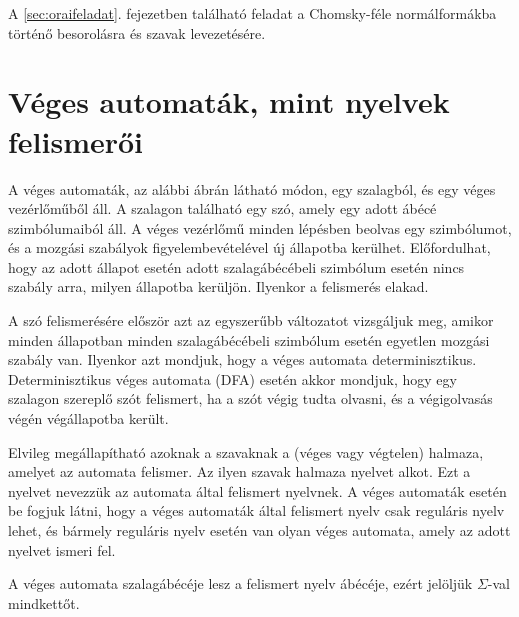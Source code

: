 \documentclass[a4paper]{article}
\begin{document}
A \ref{sec:oraifeladat}. fejezetben található feladat a Chomsky-féle
normálformákba történő besorolásra és szavak levezetésére.

\section{Véges automaták, mint nyelvek felismerői}

A véges automaták, az alábbi ábrán látható módon, egy szalagból,
és egy véges vezérlőműből áll. A szalagon található egy szó, amely egy
adott ábécé szimbólumaiból áll. A véges vezérlőmű minden lépésben
beolvas egy szimbólumot, és a mozgási szabályok figyelembevételével új
állapotba kerülhet. Előfordulhat, hogy az adott állapot esetén adott
szalagábécébeli szimbólum esetén nincs szabály arra, milyen állapotba
kerüljön. Ilyenkor a felismerés elakad.

A szó felismerésére először azt az egyszerűbb változatot vizsgáljuk meg,
amikor minden állapotban minden szalagábécébeli szimbólum esetén
egyetlen mozgási szabály van. Ilyenkor azt mondjuk, hogy a véges
automata determinisztikus.
Determinisztikus véges automata (DFA) esetén akkor mondjuk, hogy egy
szalagon szereplő szót felismert, ha a szót végig tudta olvasni, és a
végigolvasás végén végállapotba került.

Elvileg megállapítható azoknak a szavaknak a (véges vagy végtelen)
halmaza, amelyet az automata felismer. Az ilyen szavak halmaza nyelvet
alkot. Ezt a nyelvet nevezzük az automata által felismert nyelvnek. A
véges automaták esetén be fogjuk látni, hogy a véges automaták által
felismert nyelv csak reguláris nyelv lehet, és bármely reguláris nyelv
esetén van olyan véges automata, amely az adott nyelvet ismeri fel.

A véges automata szalagábécéje lesz a felismert nyelv ábécéje, ezért
jelöljük $\Sigma$-val mindkettőt.

\end{document}
